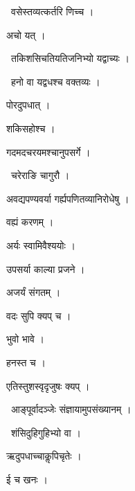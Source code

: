 \documentclass[10pt, openany, oneside]{book}
\begin{document}
\par\noindent\hspace{1.5em}{\vps वा॰}~{\qt वसेस्तव्यत्कर्तरि णिच्च ।}

\noindent अचो यत् ।

\par\noindent\hspace{1.5em}{\vps वा॰}~{\qt तकिशसिचतियतिजनिभ्यो यद्वाच्यः ।}

\par\noindent\hspace{1.5em}{\vps वा॰}~{\qt हनो वा यद्वधश्च वक्तव्यः ।}

\noindent पोरदुपधात् ।

\noindent शकिसहोश्च ।

\noindent गदमदचरयमश्चानुपसर्गे ।

\par\noindent\hspace{1.5em}{\vps वा॰}~{\qt चरेराङि चागुरौ ।}

\noindent अवद्यपण्यवर्या गर्ह्यपणितव्यानिरोधेषु ।

\noindent वह्यं करणम् ।

\noindent अर्यः स्वामिवैश्ययोः ।

\noindent उपसर्या काल्या प्रजने ।

\noindent अजर्यं संगतम् ।

\noindent वदः सुपि क्यप् च ।

\noindent भुवो भावे ।

\noindent हनस्त च ।

\noindent एतिस्तुशस्वृदृजुषः क्यप् ।

\par\noindent\hspace{1.5em}{\vps वा॰}~{\qt आङ्पूर्वादञ्जेः संज्ञायामुपसंख्यानम् ।}

\par\noindent\hspace{1.5em}{\vps वा॰}~{\qt शंसिदुहिगुहिभ्यो वा ।}

\noindent ऋदुपधाच्चाकॢपिचृतेः ।

\noindent ई च खनः ।
\end{document}
